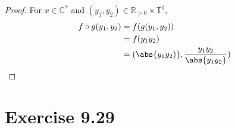 \documentclass{abrice}
\newcommand{\R}{\mathbb{R}}
\renewcommand{\C}{\mathbb{C}}
\newcommand{\T}{\mathbb{T}}
\begin{document}
\begin{proof}
  For $x \in \C^*$ and $(y_1, y_2) \in \R_{>0} \times \T^1$,
  \begin{align*}
    f \circ g(y_1, y_2)
    &= f(g(y_1, y_2)) \\
    &= f(y_1 y_2) \\
    &= (\abs{y_1 y_2)}, {y_1 y_2 \over \abs{y_1 y_2}})
  \end{align*}
\end{proof}

\section{Exercise 9.29}
\end{document}
